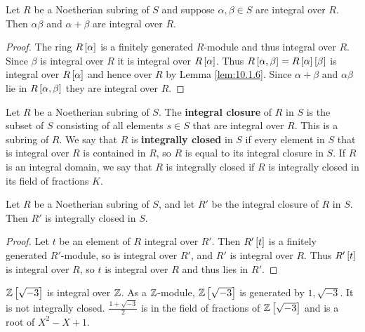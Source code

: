 \begin{corollary}
Let $ R $ be a Noetherian subring of $ S $ and suppose $ \alpha, \beta \in S $ are integral over $ R $. Then $ \alpha\beta $ and $ \alpha + \beta $ are integral over $ R $.
\end{corollary}

\begin{proof}
The ring $ R\sb{\alpha} $ is a finitely generated $ R $-module and thus integral over $ R $. Since $ \beta $ is integral over $ R $ it is integral over $ R\sb{\alpha} $. Thus $ R\sb{\alpha, \beta} = R\sb{\alpha}\sb{\beta} $ is integral over $ R\sb{\alpha} $ and hence over $ R $ by Lemma \ref{lem:10.1.6}. Since $ \alpha + \beta $ and $ \alpha\beta $ lie in $ R\sb{\alpha, \beta} $ they are integral over $ R $.
\end{proof}


\begin{definition}
Let $ R $ be a Noetherian subring of $ S $. The \textbf{integral closure} of $ R $ in $ S $ is the subset of $ S $ consisting of all elements $ s \in S $ that are integral over $ R $. This is a subring of $ R $. We say that $ R $ is \textbf{integrally closed} in $ S $ if every element in $ S $ that is integral over $ R $ is contained in $ R $, so $ R $ is equal to its integral closure in $ S $. If $ R $ is an integral domain, we say that $ R $ is integrally closed if $ R $ is integrally closed in its field of fractions $ K $.
\end{definition}

\begin{lemma}
Let $ R $ be a Noetherian subring of $ S $, and let $ R' $ be the integral closure of $ R $ in $ S $. Then $ R' $ is integrally closed in $ S $.
\end{lemma}

\begin{proof}
Let $ t $ be an element of $ R $ integral over $ R' $. Then $ R'\sb{t} $ is a finitely generated $ R' $-module, so is integral over $ R' $, and $ R' $ is integral over $ R $. Thus $ R'\sb{t} $ is integral over $ R $, so $ t $ is integral over $ R $ and thus lies in $ R' $.
\end{proof}

\begin{example*}
$ \Z\sb{\sqrt{-3}} $ is integral over $ \Z $. As a $ \Z $-module, $ \Z\sb{\sqrt{-3}} $ is generated by $ 1, \sqrt{-3} $. It is not integrally closed. $ \tfrac{1 + \sqrt{-3}}{2} $ is in the field of fractions of $ \Z\sb{\sqrt{-3}} $ and is a root of $ X^2 - X + 1 $.
\end{example*}

